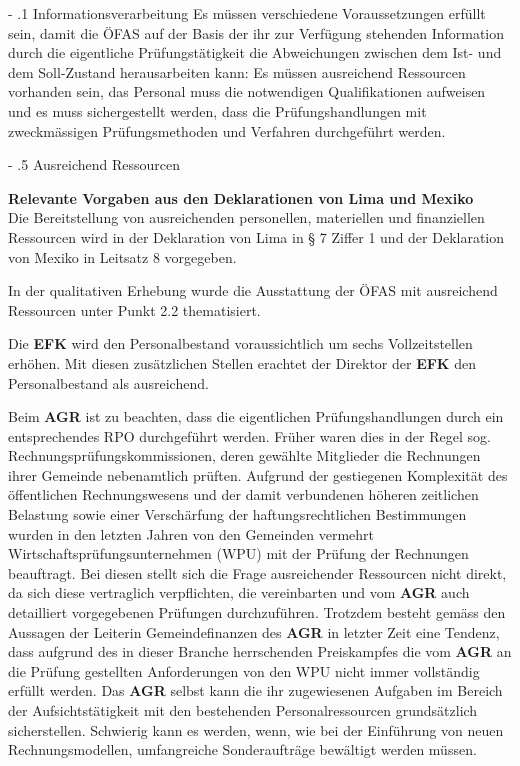 \documentclass[10pt]{article}
\makeatletter
\renewcommand\paragraph{\@startsection{paragraph}{3}{0mm}{-\baselineskip}{.1\baselineskip}{\normalfont\normalsize\bfseries}}
\renewcommand\subparagraph{\@startsection{subparagraph}{4}{0mm}{-\baselineskip}{.1\baselineskip}{\normalfont\normalsize\bfseries}}
\renewcommand\paragraph{%
\@startsection{paragraph}{3}{0mm}%
{-\baselineskip}%
{.1\baselineskip}%
{\normalfont\normalsize\bfseries}}
\renewcommand\subparagraph{%
\@startsection{subparagraph}{4}{0mm}%
{-\baselineskip}%
{.1\baselineskip}%
{\normalfont\normalsize\bfseries}}
\makeatother
\begin{document}
\paragraph{Informationsverarbeitung}\label{para:informationsverarbeitung}
Es müssen verschiedene Voraussetzungen erfüllt sein, damit die ÖFAS auf der Basis der ihr zur Verfügung stehenden Information durch die eigentliche Prüfungstätigkeit die Abweichungen zwischen dem Ist- und dem Soll-Zustand herausarbeiten kann: Es müssen ausreichend Ressourcen vorhanden sein, das Personal muss die notwendigen Qualifikationen aufweisen und es muss sichergestellt werden, dass die Prüfungshandlungen mit zweckmässigen Prüfungsmethoden und Verfahren durchgeführt werden.

\makeatletter
\renewcommand\subparagraph{%
\@startsection{subparagraph}{4}{0mm}%
{-\baselineskip}%
{.5\baselineskip}%
{\normalfont\normalsize\bfseries}}
\makeatother
\subparagraph{Ausreichend Ressourcen}\label{subpara:ausreichend_ressourcen}
\begin{shaded}
\textbf{Relevante Vorgaben aus den Deklarationen von Lima und Mexiko}\\
Die Bereitstellung von ausreichenden personellen, materiellen und finanziellen Ressourcen wird in der Deklaration von Lima in § 7 Ziffer 1 und der Deklaration von Mexiko in Leitsatz 8 vorgegeben.

\end{shaded}
In der qualitativen Erhebung wurde die Ausstattung der ÖFAS mit ausreichend Ressourcen unter Punkt 2.2 thematisiert.

Die \textbf{EFK} wird den Personalbestand voraussichtlich um sechs Vollzeitstellen erhöhen. Mit diesen zusätzlichen Stellen erachtet der Direktor der \textbf{EFK} den Personalbestand als ausreichend.

Beim \textbf{AGR} ist zu beachten, dass die eigentlichen Prüfungshandlungen durch ein entsprechendes RPO durchgeführt werden. Früher waren dies in der Regel sog. Rechnungsprüfungskommissionen, deren gewählte Mitglieder die Rechnungen ihrer Gemeinde nebenamtlich prüften. Aufgrund der gestiegenen Komplexität des öffentlichen Rechnungswesens und der damit verbundenen höheren zeitlichen Belastung sowie einer Verschärfung der haftungsrechtlichen Bestimmungen wurden in den letzten Jahren von den Gemeinden vermehrt Wirtschaftsprüfungsunternehmen (WPU) mit der Prüfung der Rechnungen beauftragt. Bei diesen stellt sich die Frage ausreichender Ressourcen nicht direkt, da sich diese vertraglich verpflichten, die vereinbarten und vom \textbf{AGR} auch detailliert vorgegebenen Prüfungen durchzuführen. Trotzdem besteht gemäss den Aussagen der Leiterin Gemeindefinanzen des \textbf{AGR} in letzter Zeit eine Tendenz, dass aufgrund des in dieser Branche herrschenden Preiskampfes die vom \textbf{AGR} an die Prüfung gestellten Anforderungen von den WPU nicht immer vollständig erfüllt werden. Das \textbf{AGR} selbst kann die ihr zugewiesenen Aufgaben im Bereich der Aufsichtstätigkeit mit den bestehenden Personalressourcen grundsätzlich sicherstellen. Schwierig kann es werden, wenn, wie bei der Einführung von neuen Rechnungsmodellen, umfangreiche Sonder­aufträge bewältigt werden müssen. 
\end{document}
